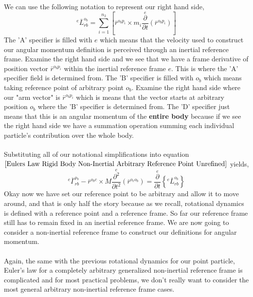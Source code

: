 We can use the following notation to represent our right hand side,
\begin{equation}
{}^{e}\bar{L}^{o_{b}}_{rb} = \sum^{n_{2}}_{i = 1}\left[ \bar{r}^{o_{b}p_{i}}\times m_{i}\overset{e}{\frac{\partial}{\partial t}}\left(\bar{r}^{o_{b}p_{i}}\right)\right]
\label{angular momentum for rigid body}
\end{equation}
The 'A' specifier is filled with $e$ which means that the velocity used to construct our angular momentum definition is perceived through an inertial reference frame.
Examine the right hand side and we see that we have a frame derivative of position vector $\bar{r}^{o_{b}p_{i}}$ within the inertial reference frame $e$.
This is where the 'A' specifier field is determined from.
The 'B' specifier is filled with $o_{b}$ which means taking reference point of arbitrary point $o_{b}$.
Examine the right hand side where our "arm vector" is $\bar{r}^{o_{b}p_{i}}$ which is means that the vector starts at arbitrary position $o_{b}$ where the 'B' specifier is determined from.
The 'D' specifier just means that this is an angular momentum of the \textbf{entire body} because if we see the right hand side we have a summation operation summing each individual particle's contribution over the whole body.
\\~\\Substituting all of our notational simplifications into equation $\ref{Eulers Law Rigid Body Non-Inertial Arbitrary Reference Point Unrefined}$ yields,
\begin{equation}
{}^{e}\bar{\Gamma}^{o_{b}}_{rb}
- \bar{r}^{o_{b}c}\times M\overset{e}{\frac{\partial^{2}}{\partial t^{2}}}(\bar{r}^{o_{e}o_{b}})
= \overset{e}{\frac{\partial}{\partial t}}\left\{{}^{e}\bar{L}^{o_{b}}_{rb}\right\}
\label{Eulers Law Rigid Body Non-Inertial Arbitary Reference Point Refined}
\end{equation}
Okay now we have set our reference point to be arbitrary and allow it to move around, and that is only half the story because as we recall, rotational dynamics is defined with a reference point and a reference frame.
So far our reference frame still has to remain fixed in an inertial reference frame.
We are now going to consider a non-inertial reference frame to construct our definitions for angular momentum.
\\~\\Again, the same with the previous rotational dynamics for our point particle, Euler's law for a completely arbitrary generalized non-inertial reference frame is complicated and for most practical problems, we don't really want to consider the most general arbitrary non-inertial reference frame cases.
